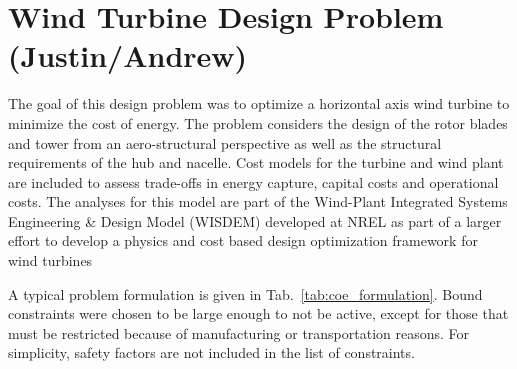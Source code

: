 \documentclass[]{aiaa-tc} %
\begin{document}
  \section{Wind Turbine Design Problem (Justin/Andrew)}

    The goal of this design problem was to optimize a horizontal axis wind turbine to minimize the cost of energy. The problem considers the design of the rotor blades and tower from an aero-structural perspective as well as the structural requirements of the hub and nacelle.  Cost models for the turbine and wind plant are included to assess trade-offs in energy capture, capital costs and operational costs.  The analyses for this model are part of the Wind-Plant Integrated Systems Engineering \& Design Model (WISDEM) developed at NREL as part of a larger effort to develop a physics and cost based design optimization framework for wind turbines  \cite{Dykes2014a,Ning2013a,Ning2014,Ning2014d}

    A typical problem formulation is given in Tab.~\ref{tab:coe_formulation}.  Bound constraints were chosen to be large enough to not be active, except for those that must be restricted because of manufacturing or transportation reasons.  For simplicity, safety factors are not included in the list of constraints.
\end{document}
